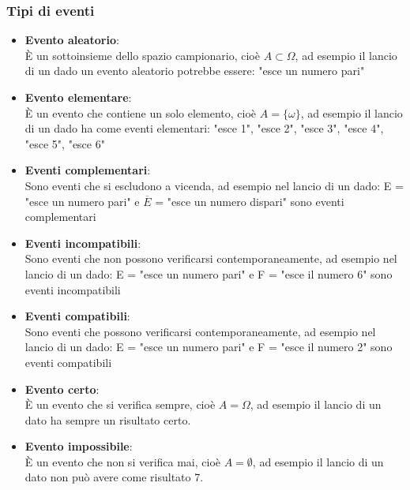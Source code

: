 \documentclass[a4paper]{article}
\theoremstyle{break}
\theoremstyle{break}
\theoremstyle{break}
\theoremstyle{break}
\begin{document}
\subsubsection{Tipi di eventi}
\begin{itemize}
	\item \textbf{Evento aleatorio}:\\
	      È un sottoinsieme dello spazio campionario, cioè \( A \subset \Omega \),
	      ad esempio il lancio di un dado un evento aleatorio potrebbe essere:
	      "esce un numero pari"
	\item \textbf{Evento elementare}:\\
	      È un evento che contiene un solo elemento, cioè \( A = \{\omega\} \), ad esempio il
	      lancio di un dado ha come eventi elementari:
	      "esce 1", "esce 2", "esce 3", "esce 4", "esce 5", "esce 6"
	\item \textbf{Eventi complementari}:\\
	      Sono eventi che si escludono a vicenda, ad esempio nel lancio di un dado:
	      E = "esce un numero pari" e \( \overline{E} \) = "esce un numero dispari"
	      sono eventi complementari
	\item \textbf{Eventi incompatibili}:\\
	      Sono eventi che non possono verificarsi contemporaneamente, ad esempio nel lancio di un dado:
	      E = "esce un numero pari" e F = "esce il numero 6" sono eventi incompatibili
	\item \textbf{Eventi compatibili}:\\
	      Sono eventi che possono verificarsi contemporaneamente, ad esempio nel lancio di un dado:
	      E = "esce un numero pari" e F = "esce il numero 2" sono eventi compatibili
	\item \textbf{Evento certo}:\\
	      È un evento che si verifica sempre, cioè \( A = \Omega \), ad esempio il lancio di
	      un dato ha sempre un risultato certo.
	\item \textbf{Evento impossibile}:\\
	      È un evento che non si verifica mai, cioè \( A = \emptyset \), ad esempio il lancio di
	      un dato non può avere come risultato 7.
\end{itemize}
\end{document}
